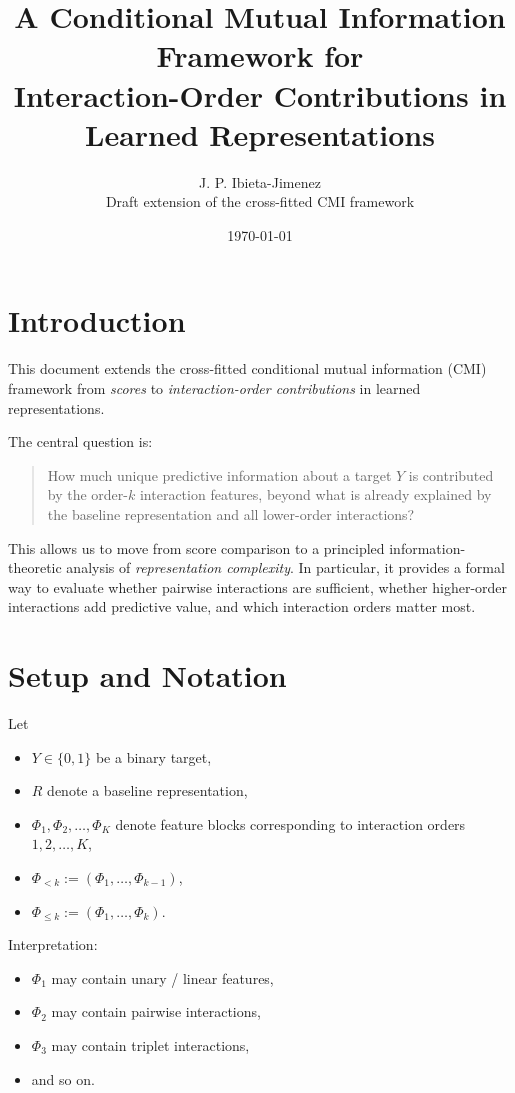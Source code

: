 \documentclass[11pt]{article}
\title{A Conditional Mutual Information Framework for\\
Interaction-Order Contributions in Learned Representations}
\author{J. P. Ibieta-Jimenez\\
\small Draft extension of the cross-fitted CMI framework}
\date{\today}
\newcommand{\1}{\mathbf{1}}
\begin{document}
\maketitle

\section{Introduction}

This document extends the cross-fitted conditional mutual information (CMI) framework from
\emph{scores} to \emph{interaction-order contributions} in learned representations.

The central question is:
\begin{quote}
How much unique predictive information about a target $Y$ is contributed by the order-$k$
interaction features, beyond what is already explained by the baseline representation and all
lower-order interactions?
\end{quote}

This allows us to move from score comparison to a principled information-theoretic analysis of
\emph{representation complexity}. In particular, it provides a formal way to evaluate whether
pairwise interactions are sufficient, whether higher-order interactions add predictive value, and
which interaction orders matter most.

\section{Setup and Notation}

Let
\begin{itemize}[leftmargin=1.5em]
    \item $Y \in \{0,1\}$ be a binary target,
    \item $R$ denote a baseline representation,
    \item $\Phi_1, \Phi_2, \ldots, \Phi_K$ denote feature blocks corresponding to interaction orders
    $1,2,\ldots,K$,
    \item $\Phi_{<k} := (\Phi_1,\ldots,\Phi_{k-1})$,
    \item $\Phi_{\le k} := (\Phi_1,\ldots,\Phi_k)$.
\end{itemize}

Interpretation:
\begin{itemize}[leftmargin=1.5em]
    \item $\Phi_1$ may contain unary / linear features,
    \item $\Phi_2$ may contain pairwise interactions,
    \item $\Phi_3$ may contain triplet interactions,
    \item and so on.
\end{itemize}
\end{document}
